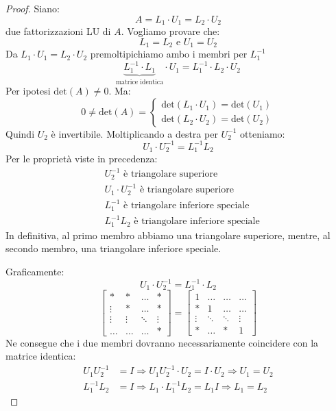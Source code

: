 \documentclass[12pt]{report}
\begin{document}
\begin{proof} Siano:
\[
A = L_1 \cdot U_1 = L_2 \cdot U_2
\]
due fattorizzazioni LU di $A$. Vogliamo provare che:
\[
L_1 = L_2 \text{ e } U_1 = U_2
\]
Da $L_1 \cdot U_1 = L_2 \cdot U_2$ premoltipichiamo ambo i membri per $L_1^{-1}$
\[
\underset{\text{matrice identica}}{\underbrace{{L_{1}^{-1} \cdot L_1}}} \cdot U_1 = L_1^{-1}\cdot L_2 \cdot U_2
\]
Per ipotesi $\text{det}(A) \neq 0$. Ma:
\[
0 \neq \text{det}(A) = \begin{cases}
	\text{det}(L_1 \cdot U_1) = \text{det}(U_1) \\
	\text{det}(L_2 \cdot U_2) = \text{det}(U_2)
\end{cases}
\]
Quindi $U_2$ è invertibile. Moltiplicando a destra per $U_2^{-1}$ otteniamo:
\[
U_1 \cdot U_2^{-1} = L_1^{-1}L_2
\]
Per le proprietà viste in precedenza:
\begin{align*}
	&U_2^{-1} \text{ è triangolare superiore} \\
	&U_1 \cdot U_2^{-1} \text{ è triangolare superiore} \\
	&L_1^{-1} \text{ è triangolare inferiore speciale} \\
	&L_1^{-1}L_2 \text{ è triangolare inferiore speciale}
\end{align*}
In definitiva, al primo membro abbiamo una triangolare superiore, mentre, al secondo membro, una triangolare inferiore speciale.

Graficamente:
\[
U_1 \cdot U_2^{-1} = L_1^{-1} \cdot L_2
\]
\begin{equation*}
\begin{bmatrix}
* & * & \dots  & * \\
\vdots & * & \dots  & * \\
\vdots & \vdots & \ddots & \vdots \\
\dots  & \dots  & \dots  & * \end{bmatrix}
=
\begin{bmatrix}
1      & \dots  & \dots  & \dots  \\
* & 1      & \dots  & \dots  \\
\vdots & \ddots & \ddots & \vdots \\
* & \dots  & * & 1
\end{bmatrix}
\end{equation*}
Ne consegue che i due membri dovranno necessariamente coincidere con la matrice identica:
\begin{align*}
	U_1U_2^{-1} &= I \Rightarrow U_1U_2^{-1} \cdot U_2 = I \cdot U_2 \Rightarrow U_1 = U_2 \\
	L_1^{-1}L_2 &= I \Rightarrow L_1 \cdot L_1^{-1}L_2 = L_1 I \Rightarrow L_1 = L_2
\end{align*}
\end{proof}
\end{document}
